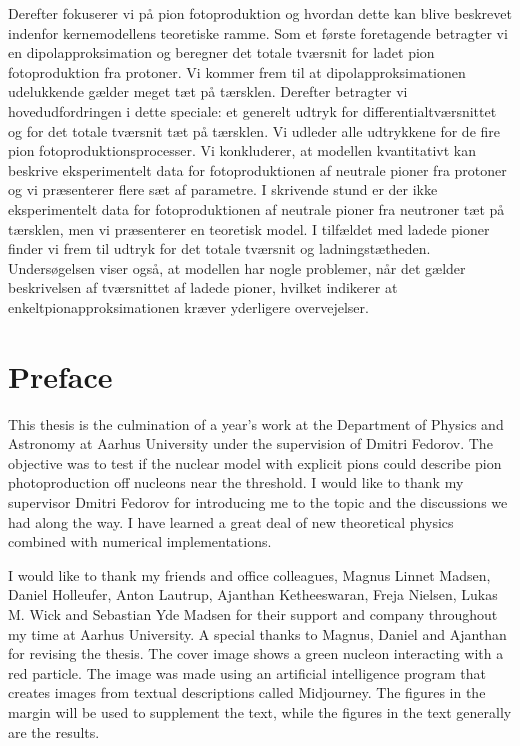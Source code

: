 Derefter fokuserer vi på pion fotoproduktion og hvordan dette kan blive beskrevet indenfor kernemodellens teoretiske ramme. Som et første foretagende betragter vi en dipolapproksimation og beregner det totale tværsnit for ladet pion fotoproduktion fra protoner. Vi kommer frem til at dipolapproksimationen udelukkende gælder meget tæt på tærsklen. Derefter betragter vi hovedudfordringen i dette speciale: et generelt udtryk for differentialtværsnittet og for det totale tværsnit tæt på tærsklen. Vi udleder alle udtrykkene for de fire pion fotoproduktionsprocesser. Vi konkluderer, at modellen kvantitativt kan beskrive eksperimentelt data for fotoproduktionen af neutrale pioner fra protoner og vi præsenterer flere sæt af parametre. I skrivende stund er der ikke eksperimentelt data for fotoproduktionen af neutrale pioner fra neutroner tæt på tærsklen, men vi præsenterer en teoretisk model. I tilfældet med ladede pioner finder vi frem til udtryk for det totale tværsnit og ladningstætheden. Undersøgelsen viser også, at modellen har nogle problemer, når det gælder beskrivelsen af tværsnittet af ladede pioner, hvilket indikerer at enkeltpionapproksimationen kræver yderligere overvejelser.

\newpage
\section*{Preface}
\thispagestyle{empty}
This thesis is the culmination of a year's work at the Department of Physics and Astronomy at Aarhus University under the supervision of Dmitri Fedorov. The objective was to test if the nuclear model with explicit pions could describe pion photoproduction off nucleons near the threshold.
I would like to thank my supervisor Dmitri Fedorov for introducing me to the topic and the discussions we had along the way. I have learned a great deal of new theoretical physics combined with numerical implementations. 

I would like to thank my friends and office colleagues, Magnus Linnet Madsen, Daniel Holleufer, Anton Lautrup, Ajanthan Ketheeswaran, Freja Nielsen, Lukas M. Wick and Sebastian Yde Madsen for their support and company throughout my time at Aarhus University. A special thanks to Magnus, Daniel and Ajanthan for revising the thesis.
The cover image shows a green nucleon interacting with a red particle. The image was made using an artificial intelligence program that creates images from textual descriptions called Midjourney. The figures in the margin will be used to supplement the text, while the figures in the text generally are the results.
\vspace{1cm}
\clearpage
\thispagestyle{empty}\mbox{}
\clearpage
